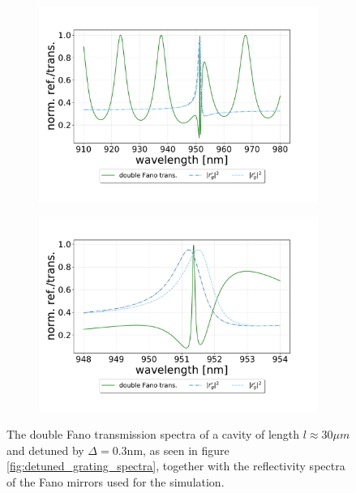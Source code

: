 \begin{figure}[h!]
    \centering
    \begin{subfigure}[b]{0.49\textwidth}
        \centering
        \includegraphics[width=\textwidth]{figures/detuned_full_range_double_trans.pdf}
        \caption{}
        \label{fig:full_range_detuned_trans}
    \end{subfigure}
    \begin{subfigure}[b]{0.49\textwidth}
        \centering
        \includegraphics[width=\textwidth]{figures/detuned_short_range_double_trans.pdf}
        \caption{}
        \label{fig:short_range_detuned_trans}
    \end{subfigure}
    \caption{The double Fano transmission spectra of a cavity of length $l \approx 30 \mu m$ and detuned by $\Delta = 0.3$nm, as seen in figure \ref{fig:detuned_grating_spectra}, together with the reflectivity spectra of the Fano mirrors used for the simulation.}
    \label{fig:detuned_double_fano_transmission}
\end{figure}

